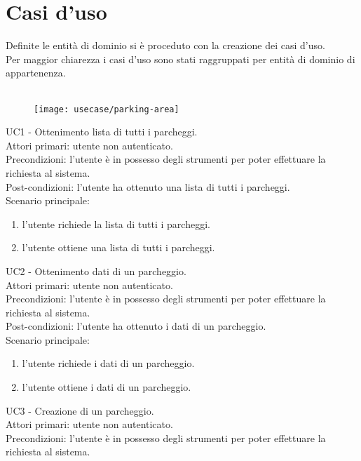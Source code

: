 \section{Casi d'uso}
Definite le entità di dominio si è proceduto con la creazione dei casi d'uso.
\\
Per maggior chiarezza i casi d'uso sono stati raggruppati per entità di dominio di appartenenza.
\\\\

\begin{figure}[!h]
    \centering
    \texttt{[image: usecase/parking-area]}
\end{figure}
UC1 - Ottenimento lista di tutti i parcheggi.
\\
Attori primari: utente non autenticato.
\\
Precondizioni: l'utente è in possesso degli strumenti per poter effettuare la richiesta al sistema.
\\
Post-condizioni: l'utente ha ottenuto una lista di tutti i parcheggi.
\\
Scenario principale:
\begin{enumerate}
    \item l'utente richiede la lista di tutti i parcheggi.
    \item l'utente ottiene una lista di tutti i parcheggi.
\end{enumerate}
\leavevmode\newline
UC2 - Ottenimento dati di un parcheggio.
\\
Attori primari: utente non autenticato.
\\
Precondizioni: l'utente è in possesso degli strumenti per poter effettuare la richiesta al sistema.
\\
Post-condizioni: l'utente ha ottenuto i dati di un parcheggio.
\\
Scenario principale:
\begin{enumerate}
    \item l'utente richiede i dati di un parcheggio.
    \item l'utente ottiene i dati di un parcheggio.
\end{enumerate}
\leavevmode\newline
UC3 - Creazione di un parcheggio.
\\
Attori primari: utente non autenticato.
\\
Precondizioni: l'utente è in possesso degli strumenti per poter effettuare la richiesta al sistema.
\\
